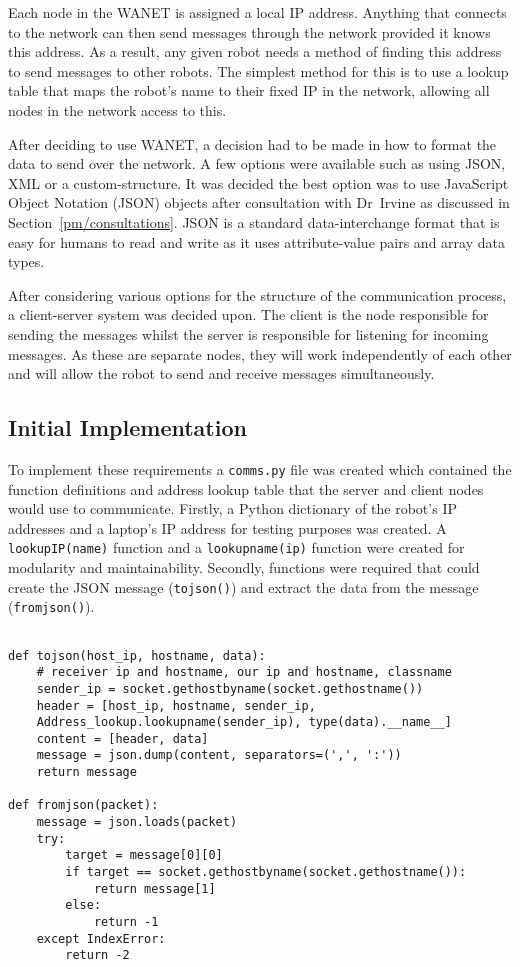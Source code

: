 Each node in the WANET is assigned a local IP address.
Anything that connects to the network can then send messages through
the network provided it knows this address. As a result, any given robot
needs a method of finding this address to send messages to other robots. The simplest method for this is to use a lookup table
that maps the robot's name to their fixed IP in the network, allowing
all nodes in the network access to this.

After deciding to use WANET, a decision  had to be made in how to format
the data to send over the network. A few options were available such as
using JSON, XML or a custom-structure. It was decided the best option was
to use JavaScript Object Notation (JSON) objects after consultation with
Dr~Irvine as discussed in Section~\ref{pm/consultations}. JSON is a
standard data-interchange format that is easy for humans to read and write
as it uses attribute-value pairs and array data types.

After considering various options for the structure of the communication process,
a client-server system was decided upon. The client is the node
responsible for sending the messages whilst the server is responsible
for listening for incoming messages. As these are separate nodes,
they will work independently of each other and will allow the
robot to send and receive messages simultaneously.

\subsection{Initial Implementation}\label{soft/comms/iniimpl}
To implement these requirements a \verb|comms.py| file was created which contained
the function definitions and address lookup table that the server and
client nodes would use to communicate. Firstly, a Python dictionary of the
robot's IP addresses and a laptop's IP address for testing purposes was created.
A \verb|lookupIP(name)| function and a \verb|lookupname(ip)| function were created for
modularity and maintainability. Secondly, functions were required that could
create the JSON message (\verb|tojson()|) and extract the data from
the message (\verb|fromjson()|).

\begin{lstlisting}[caption={JSON Conversion Functions}, label={lst:comms_json}]

def tojson(host_ip, hostname, data):
    # receiver ip and hostname, our ip and hostname, classname
    sender_ip = socket.gethostbyname(socket.gethostname())
    header = [host_ip, hostname, sender_ip,
    Address_lookup.lookupname(sender_ip), type(data).__name__]
    content = [header, data]
    message = json.dump(content, separators=(',', ':'))
    return message

def fromjson(packet):
    message = json.loads(packet)
    try:
        target = message[0][0]
        if target == socket.gethostbyname(socket.gethostname()):
            return message[1]
        else:
            return -1
    except IndexError:
        return -2
\end{lstlisting}

